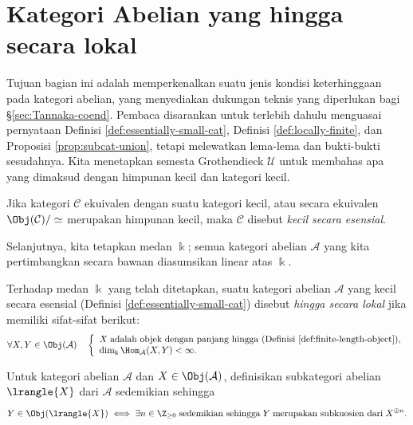 \section{Kategori Abelian yang hingga secara lokal}\label{sec:locally-finite-Abel-cat}
Tujuan bagian ini adalah memperkenalkan suatu jenis kondisi keterhinggaan pada kategori abelian, yang menyediakan dukungan teknis yang diperlukan bagi \S\ref{sec:Tannaka-coend}. Pembaca disarankan untuk terlebih dahulu menguasai pernyataan Definisi \ref{def:essentially-small-cat}, Definisi \ref{def:locally-finite}, dan Proposisi \ref{prop:subcat-union}, tetapi melewatkan lema-lema dan bukti-bukti sesudahnya. Kita menetapkan semesta Grothendieck $\mathcal{U}$ untuk membahas apa yang dimaksud dengan himpunan kecil dan kategori kecil.

\begin{definition}\label{def:essentially-small-cat}
	Jika kategori $\mathcal{C}$ ekuivalen dengan suatu kategori kecil, atau secara ekuivalen $\Obj(\mathcal{C})/\simeq$ merupakan himpunan kecil, maka $\mathcal{C}$ disebut \emph{kecil secara esensial}.
\end{definition}

Selanjutnya, kita tetapkan medan $\Bbbk$; semua kategori abelian $\mathcal{A}$ yang kita pertimbangkan secara bawaan diasumsikan linear atas $\Bbbk$.

\begin{definition}\label{def:locally-finite}
	Terhadap medan $\Bbbk$ yang telah ditetapkan, suatu kategori abelian $\mathcal{A}$ yang kecil secara esensial (Definisi \ref{def:essentially-small-cat}) disebut \emph{hingga secara lokal} jika memiliki sifat-sifat berikut:
	\begin{equation*}
		\forall X, Y \in \Obj(\mathcal{A}) \quad
		\left\{\begin{array}{l}
			X\; \text{adalah objek dengan panjang hingga (Definisi \ref{def:finite-length-object})}, \\
			\dim_{\Bbbk} \Hom_{\mathcal{A}}(X, Y) < \infty.
		\end{array}\right.
	\end{equation*}
\end{definition}

\begin{convention}
	Untuk kategori abelian $\mathcal{A}$ dan $X \in \Obj(\mathcal{A})$, definisikan subkategori abelian $\lrangle{X}$ dari $\mathcal{A}$ sedemikian sehingga
	\[ Y \in \Obj(\lrangle{X}) \iff \exists n \in \Z_{\geq 0} \; \text{sedemikian sehingga}\; Y \;\text{merupakan subkuosien dari}\; X^{\oplus n}. \]
\end{convention}

